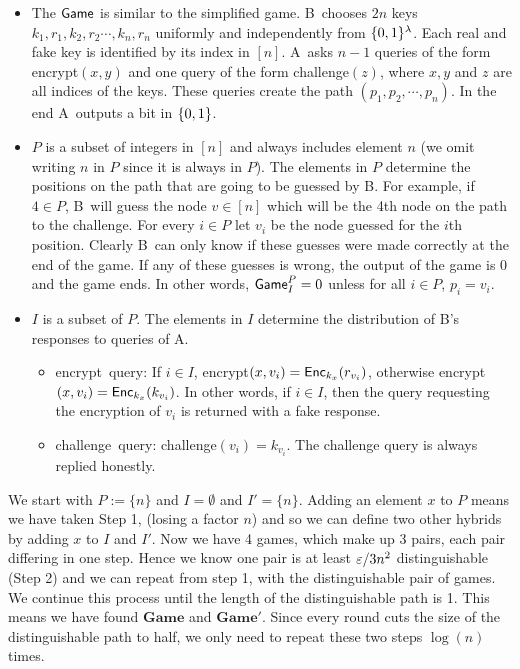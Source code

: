 \documentclass{article}
\def\B{{\sf B}}
\def\A{{\sf A}}
\newcommand{\encrypt}{{\sf encrypt}}
\newcommand{\game}{{\sf Game}}
\newcommand{\dgame}{{\mathbf{Game}}}
\newcommand{\dgg}[2]{\game_{#1}^{#2}}
\def\challenge{{\sf challenge}}
\begin{document}
\begin{itemize}
\item The $\game$ is similar to the simplified game. \B~chooses $2n$ keys $k_1,r_1,k_2,r_2\cdots,k_n,r_n$ uniformly and independently from $\{0,1\}^\lambda$. Each real and fake key is identified by its index in $[n]$. \A~asks $n-1$ queries of the form \encrypt$(x,y)$ and one query of the form \challenge$(z)$, where $x,y$ and $z$ are all indices of the keys. These queries create the path $(p_1,p_2,\cdots, p_n)$. In the end \A~outputs a bit in $\{0,1\}$.
 
\item $P$ is a subset of integers in $[n]$ and always includes element $n$ (we omit writing $n$ in $P$ since it is always in $P$). The elements in $P$ determine the positions on the path that are going to be guessed by \B. For example, if $4\in P$, \B~will guess the node $v\in [n]$  which will be the 4th node on the path to the challenge. For every $i \in P$ let $v_i$ be the node guessed for the $i$th position. Clearly \B~can only know if these guesses were made correctly at the end of the game. If any of these guesses is wrong, the output of the game is $0$ and the game ends. In other words, $\dgg{I}{P}=0$ unless for all $i\in P$, $p_i=v_i$.

\item $I$ is a subset of $P$. The elements in $I$ determine the distribution of \B's responses to queries of \A.
\begin{itemize}
\item \encrypt~query: If $i\in I$, \encrypt$(x,v_i)={\sf Enc}_{k_x}(r_{v_i})$, otherwise \encrypt$(x,v_i)={\sf Enc}_{k_x}(k_{v_i})$. In other words, if $i\in I$, then the query requesting the encryption of $v_i$ is returned with a fake response.
\item \challenge~query: \challenge$(v_i)=k_{v_i}$. The challenge query is always replied honestly. 
\end{itemize}
\end{itemize}

We start with $P:=\{n\}$ and $I=\emptyset$ and $I'=\{n\}$. Adding an element $x$ to $P$ means we have taken Step 1, (losing a factor $n$) and so we can define two other hybrids by adding $x$ to $I$ and $I'$. Now we have 4 games, which make up 3 pairs, each pair differing in one step. Hence we know one pair is at least $\varepsilon/3n^2$ distinguishable (Step 2) and we can repeat from step 1, with the distinguishable pair of games. We continue this process until the length of the distinguishable path is 1. This means we have found $\dgame$ and $\dgame'$. Since every round cuts the size of the distinguishable path to half, we only need to repeat these two steps $\log(n)$ times. 
\end{document}
